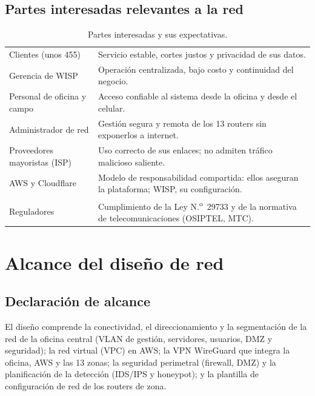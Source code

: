 \subsection{Partes interesadas relevantes a la red}

\begin{table}[H]
\centering
\caption{Partes interesadas y sus expectativas.}
\label{tab:ce03-interesados}
\small
\begin{tabularx}{\textwidth}{L{3.4cm}X}
\toprule
Clientes (unos 455) & Servicio estable, cortes justos y privacidad de sus datos. \\
Gerencia de WISP & Operación centralizada, bajo costo y continuidad del negocio. \\
Personal de oficina y campo & Acceso confiable al sistema desde la oficina y desde el celular. \\
Administrador de red & Gestión segura y remota de los 13 routers sin exponerlos a internet. \\
Proveedores mayoristas (ISP) & Uso correcto de sus enlaces; no admiten tráfico malicioso saliente. \\
AWS y Cloudflare & Modelo de responsabilidad compartida: ellos aseguran la plataforma; WISP, su configuración. \\
Reguladores & Cumplimiento de la Ley N.\textsuperscript{o}~29733 y de la normativa de telecomunicaciones (OSIPTEL, MTC). \\
\bottomrule
\end{tabularx}
\end{table}

\section{Alcance del diseño de red}

\subsection{Declaración de alcance}
El diseño comprende la conectividad, el direccionamiento y la segmentación de la red
de la oficina central (VLAN de gestión, servidores, usuarios, DMZ y seguridad); la red
virtual (VPC) en AWS; la VPN WireGuard que integra la oficina, AWS y las 13 zonas; la
seguridad perimetral (firewall, DMZ) y la planificación de la detección (IDS/IPS y
honeypot); y la plantilla de configuración de red de los routers de zona.

